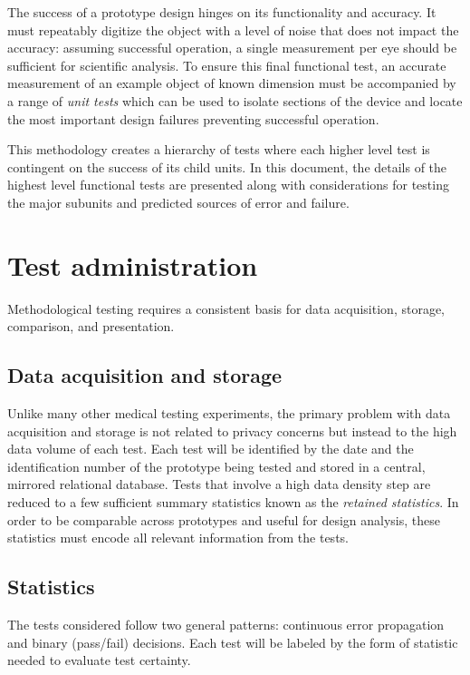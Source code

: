\documentclass{article}
\begin{document}
The success of a prototype design hinges on its functionality and accuracy. It must repeatably digitize the object with a level of noise that does not impact the accuracy: assuming successful operation, a single measurement per eye should  be sufficient for scientific analysis. To ensure this final functional test, an accurate measurement of an example object of known dimension must be accompanied by a range of \textit{unit tests} which can be used to isolate sections of the device and locate the most important design failures preventing successful operation.

This methodology creates a hierarchy of tests where each higher level test is contingent on the success of its child units. In this document, the details of the highest level functional tests are presented along with considerations for testing the major subunits and predicted sources of error and failure.

\section{Test administration}
\label{sec:test-administration}

Methodological testing requires a consistent basis for data acquisition, storage, comparison, and presentation.

\subsection{Data acquisition and storage}
\label{sec:data-acqu-stor}

Unlike many other medical testing experiments, the primary problem with data acquisition and storage is not related to privacy concerns but instead to the high data volume of each test. Each test will be identified by the date and the identification number of the prototype being tested and stored in a central, mirrored relational database. Tests that involve a high data density step are reduced to a few sufficient summary statistics known as the \textit{retained statistics}. In order to be comparable across prototypes and useful for design analysis, these statistics must encode all relevant information from the tests.

\subsection{Statistics}
\label{sec:statistics}

The tests considered follow two general patterns: continuous error
propagation and binary (pass/fail) decisions. Each test will be
labeled by the form of statistic needed to evaluate test certainty.
\end{document}
